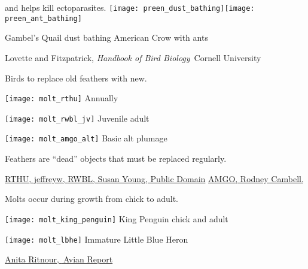 \documentclass[t]{beamer}
\begin{document}
\begin{frame}{ and  helps kill ectoparasites.}
	\texttt{[image: preen\_dust\_bathing]}\hfill \texttt{[image: preen\_ant\_bathing]}
	
	Gambel's Quail dust bathing \hfill American Crow with ants
	
	\tinyfill Lovette and Fitzpatrick, \textit{Handbook of Bird Biology} \textcopyright\,Cornell University
\end{frame}



\begin{frame}{Birds  to replace old feathers with new.}
	
	\vspace{-\baselineskip}
	
	\begin{multicols}{3}
		\texttt{[image: molt\_rthu]}\newline
		Annually
		
		\columnbreak
		\texttt{[image: molt\_rwbl\_jv]}
		Juvenile \ce{->} adult
		
		\columnbreak
		\texttt{[image: molt\_amgo\_alt]}
		Basic \ce{<->} alt plumage
	\end{multicols}
	
	\hangpara Feathers are “dead” objects that must be replaced regularly.
	
	
	\vfilll
	
	\tiny \href{https://flickr.com/photos/jeffreyww/4880304754/}{RTHU, jeffreyw, } \hfill \href{https://flickr.com/photos/95782365@N08/29218383127/}{RWBL, Susan Young, Public Domain} \hfill \href{https://flickr.com/photos/acrylicartist/17062228856/}{AMGO, Rodney Cambell, }
\end{frame}


\begin{frame}{Molts occur during growth from chick to adult.}
	
	\vspace{-\baselineskip}
	
	\begin{multicols}{2}
		\texttt{[image: molt\_king\_penguin]}\newline
		King Penguin chick and adult
		
		
		\columnbreak
		
		\texttt{[image: molt\_lbhe]}\newline
		Immature Little Blue Heron
	\end{multicols}
	
	\vfilll
	
	\tiny \href{https://flickr.com/photos/puliarfanita/24860619467/}{Anita Ritnour, } \hfill \href{https://avianreport.com/bird-molting/}{\textcopyright\,Avian Report}
	
\end{frame}
\end{document}
